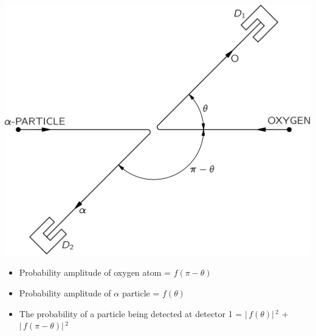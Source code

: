 \documentclass[aspectratio=169]{beamer}
\begin{document}
\begin{frame}{}


	\begin{multicols}{2}
 
		 \includegraphics[scale=0.45]{alpha-ox-2.png}
 
	\columnbreak
	
		\begin{itemize}
	
			\item Probability amplitude of oxygen atom = $f(\pi-\theta)$ \pause \newline
			\item Probability amplitude of $\alpha$ particle = $f(\theta)$ \pause \newline
			\item The probability of a particle being detected at detector 1 = $ \rvert\,f(\theta) \rvert\,^{2} $ + $ \rvert\,f(\pi - \theta) \rvert\,^{2} $
		
 		\end{itemize}
 	
	\end{multicols}
	
	
\end{frame}
\end{document}
